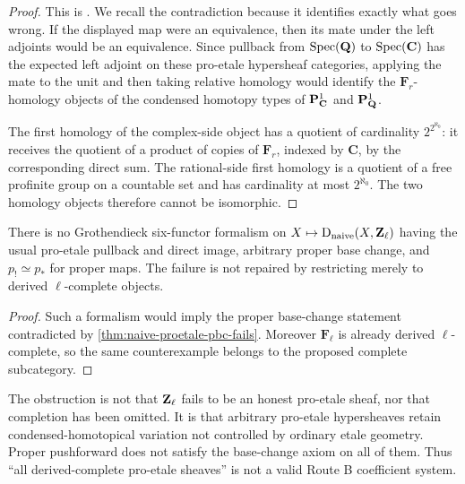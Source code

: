 \begin{proof}
This is \cite[Remark~7.15]{HaineEtAlCondensedHomotopy}.  We recall the
contradiction because it identifies exactly what goes wrong.  If the displayed
map were an equivalence, then its mate under the left adjoints would be an
equivalence.  Since pullback from \(\operatorname{Spec}(\mathbf Q)\) to
\(\operatorname{Spec}(\mathbf C)\) has the expected left adjoint on these pro-etale
hypersheaf categories, applying the mate to the unit and then taking relative
homology would identify the \(\mathbf F_r\)-homology objects of the condensed
homotopy types of \(\mathbf P^1_{\mathbf C}\) and \(\mathbf P^1_{\mathbf Q}\).

The first homology of the complex-side object has a quotient of cardinality
\(2^{2^{\aleph_0}}\): it receives the quotient of a product of copies of
\(\mathbf F_r\), indexed by \(\mathbf C\), by the corresponding direct sum.
The rational-side first homology is a quotient of a free profinite group on a
countable set and has cardinality at most \(2^{\aleph_0}\).  The two homology
objects therefore cannot be isomorphic.
\end{proof}

\begin{corollary}
There is no Grothendieck six-functor formalism on
\(X\mapsto\mathrm D_{\mathrm{naive}}(X,\mathbf Z_\ell)\) having the usual pro-etale pullback and direct
image, arbitrary proper base change, and \(p_!\simeq p_*\) for proper maps.
The failure is not repaired by restricting merely to derived
\(\ell\)-complete objects.
\end{corollary}

\begin{proof}
Such a formalism would imply the proper base-change statement contradicted by
\cref{thm:naive-proetale-pbc-fails}.  Moreover \(\mathbf F_\ell\) is already
derived \(\ell\)-complete, so the same counterexample belongs to the proposed
complete subcategory.
\end{proof}

\begin{auditbox}[title={Why the ambient category must change}]
The obstruction is not that \(\mathbf Z_\ell\) fails to be an honest pro-etale sheaf,
nor that completion has been omitted.  It is that arbitrary pro-etale
hypersheaves retain condensed-homotopical variation not controlled by
ordinary etale geometry.  Proper pushforward does not satisfy the base-change
axiom on all of them.  Thus ``all derived-complete pro-etale sheaves'' is not
a valid Route B coefficient system.
\end{auditbox}


